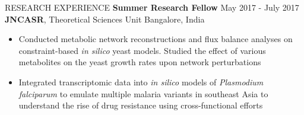 \documentclass{resume} %
\begin{document}
\begin{rSection}{RESEARCH EXPERIENCE}
   \textbf{Summer Research Fellow} \hfill May 2017 - July 2017\\
   \textbf{JNCASR}, Theoretical Sciences Unit \hfill {Bangalore, India}
   \begin{itemize}
      \itemsep -1pt {}
      \item Conducted metabolic network reconstructions and flux balance analyses on constraint-based \textit{in silico} yeast models. Studied the effect of various metabolites on the yeast growth rates upon network perturbations
      \item Integrated transcriptomic data into \textit{in silico} models of \textit{Plasmodium falciparum} to emulate multiple malaria variants in southeast Asia to understand the rise of drug resistance using cross-functional efforts
   \end{itemize}

\end{rSection}

\end{document}
